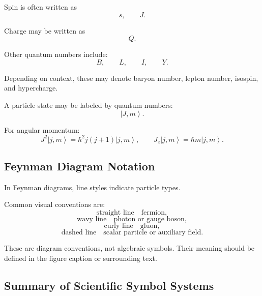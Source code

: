 \documentclass[11pt,twocolumn]{article}
\newcommand{\ket}[1]{\left|#1\right\rangle}
\begin{document}
Spin is often written as
\[
s,
\qquad
J.
\]

Charge may be written as
\[
Q.
\]

Other quantum numbers include:
\[
B,
\qquad
L,
\qquad
I,
\qquad
Y.
\]

Depending on context, these may denote baryon number, lepton number, isospin,
and hypercharge.

A particle state may be labeled by quantum numbers:
\[
\ket{J,m}.
\]

For angular momentum:
\[
J^2\ket{j,m}
=
\hbar^2 j(j+1)\ket{j,m},
\qquad
J_z\ket{j,m}
=
\hbar m\ket{j,m}.
\]

\subsection{Feynman Diagram Notation}

In Feynman diagrams, line styles indicate particle types.

Common visual conventions are:
\[
\text{straight line}
\quad
\text{fermion},
\]
\[
\text{wavy line}
\quad
\text{photon or gauge boson},
\]
\[
\text{curly line}
\quad
\text{gluon},
\]
\[
\text{dashed line}
\quad
\text{scalar particle or auxiliary field}.
\]

These are diagram conventions, not algebraic symbols. Their meaning should be
defined in the figure caption or surrounding text.

\subsection{Summary of Scientific Symbol Systems}
\end{document}
